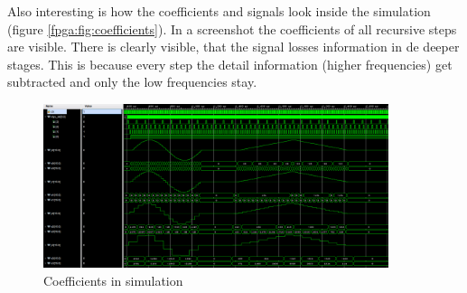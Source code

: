 \begin{refsection}
Also interesting is how the coefficients and signals look inside the simulation (figure \ref{fpga:fig:coefficients}). 
In a screenshot the coefficients of all recursive steps are visible. 
There is clearly visible, that the signal losses information in de deeper stages. 
This is because every step the detail information (higher frequencies) get subtracted and only the low frequencies stay.

\begin{figure}[h]
	\centering
	\includegraphics[width=0.9\textwidth]{papers/fpga/images/inv_branching_screenshot.png}
	\caption{Coefficients in simulation \label{fpga:fig:sim}}
\end{figure}

\newpage

%



\end{refsection}
